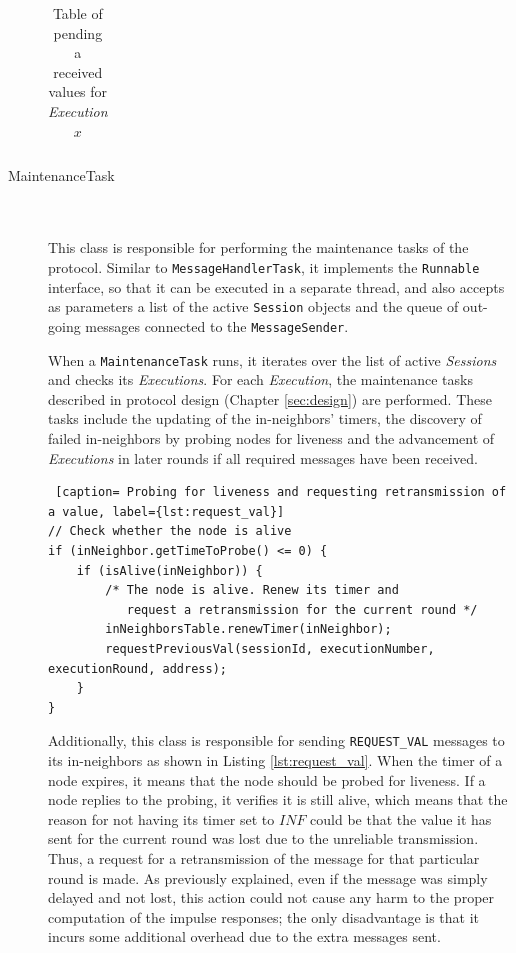 \documentclass[a4paper,11pt,twoside]{report}
\newcommand{\classname}[1]{\texttt{#1}}
\begin{document}
\begin{description}
\begin{table}[H]
\begin{tabular}{|c|c|c|}
\end{tabular}
\caption{Table of pending a received values for \textit{Execution} $x$}
\label{table:pending_values}
\end{table}


\item[MaintenanceTask] \hfill \\\\
This class is responsible for performing the maintenance tasks of the protocol. Similar to \classname{MessageHandlerTask}, it implements the \classname{Runnable} interface, so that it can be executed in a separate thread, and also accepts as parameters a list of the active \classname{Session} objects and the queue of out-going messages connected to the \classname{MessageSender}.

When a \classname{MaintenanceTask} runs, it iterates over the list of active \textit{Sessions} and checks its \textit{Executions}. For each \textit{Execution}, the maintenance tasks described in protocol design (Chapter \ref{sec:design}) are performed. These tasks include the updating of the in-neighbors' timers, the discovery of failed in-neighbors by probing nodes for liveness and the advancement of \textit{Executions} in later rounds if all required messages have been received.\\

\begin{lstlisting} [caption= Probing for liveness and requesting retransmission of a value, label={lst:request_val}]
// Check whether the node is alive 
if (inNeighbor.getTimeToProbe() <= 0) { 
	if (isAlive(inNeighbor)) {
		/* The node is alive. Renew its timer and 
		   request a retransmission for the current round */
		inNeighborsTable.renewTimer(inNeighbor);
		requestPreviousVal(sessionId, executionNumber, executionRound, address);
	}
}
\end{lstlisting}

Additionally, this class is responsible for sending \classname{REQUEST\_VAL} messages to its in-neighbors as shown in Listing \ref{lst:request_val}. When the timer of a node expires, it means that the node should be probed for liveness. If a node replies to the probing, it verifies it is still alive, which means that the reason for not having its timer set to $INF$ could be that the value it has sent for the current round was lost due to the unreliable transmission. Thus, a request for a retransmission of the message for that particular round is made. As previously explained, even if the message was simply delayed and not lost, this action could not cause any harm to the proper computation of the impulse responses; the only disadvantage is that it incurs some additional overhead due to the extra messages sent.



\end{description}
\end{document}
